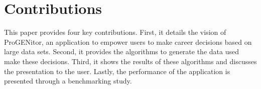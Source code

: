 \section{Contributions}
\label{sect:contributions}
This paper provides four key contributions.  First, it details the vision of
ProGENitor, an application to empower users to make career decisions based on
large data sets.  Second, it provides the algorithms to generate the data
used make these decisions.  Third, it shows the results of these algorithms and
discusses the presentation to the user.  Lastly, the performance of the
application is presented through a benchmarking study.
